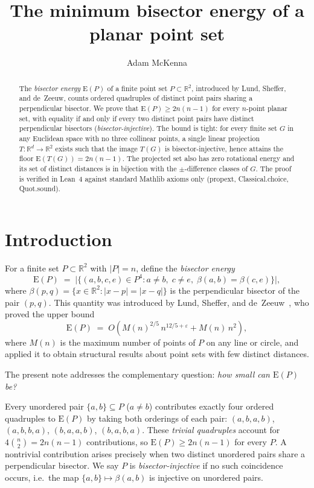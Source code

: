 \documentclass[12pt]{article}
\newcommand{\R}{\mathbb{R}}
\newcommand{\E}{\mathrm{E}}         %
\newcommand{\bis}[2]{\beta(#1,#2)}  %
\begin{document}
\title{The minimum bisector energy of a planar point set}
\author{Adam McKenna}
\date{}
\maketitle

\begin{abstract}
The \emph{bisector energy} $\E(P)$ of a finite point set $P\subset\R^2$, introduced
by Lund, Sheffer, and de~Zeeuw, counts ordered quadruples of distinct point pairs
sharing a perpendicular bisector.
We prove that $\E(P)\ge 2n(n-1)$ for every $n$-point planar set,
with equality if and only if every two distinct point pairs have distinct
perpendicular bisectors (\emph{bisector-injective}).
The bound is tight: for every finite set $G$ in any Euclidean space with no
three collinear points, a single linear projection $T\colon\R^d\to\R^2$ exists
such that the image $T(G)$ is bisector-injective, hence attains the floor
$\E(T(G))=2n(n-1)$.
The projected set also has zero rotational energy and its set of distinct
distances is in bijection with the $\pm$-difference classes of $G$.
The proof is verified in Lean~4 against standard Mathlib axioms only
(propext, Classical.choice, Quot.sound).
\end{abstract}

\section{Introduction}

For a finite set $P\subset\R^2$ with $|P|=n$, define the \emph{bisector energy}
\[
  \E(P) \;=\;
  \bigl|\{(a,b,c,e)\in P^4 : a\ne b,\; c\ne e,\;
         \bis{a}{b} = \bis{c}{e}\}\bigr|,
\]
where $\bis{p}{q} = \{x\in\R^2 : |x-p|=|x-q|\}$ is the perpendicular bisector
of the pair $(p,q)$.
This quantity was introduced by Lund, Sheffer, and de~Zeeuw~\cite{LSdZ16},
who proved the upper bound
\[
  \E(P) \;=\; O\!\left(M(n)^{2/5}\,n^{12/5+\varepsilon}+M(n)\,n^2\right),
\]
where $M(n)$ is the maximum number of points of $P$ on any line or circle,
and applied it to obtain structural results about point sets with few distinct
distances.

The present note addresses the complementary question: \emph{how small can
$\E(P)$ be?}

Every unordered pair $\{a,b\}\subseteq P$ ($a\ne b$) contributes exactly four
ordered quadruples to $\E(P)$ by taking both orderings of each pair:
$(a,b,a,b)$, $(a,b,b,a)$, $(b,a,a,b)$, $(b,a,b,a)$.
These \emph{trivial quadruples} account for $4\binom{n}{2}=2n(n-1)$ contributions,
so $\E(P)\ge 2n(n-1)$ for every $P$.
A nontrivial contribution arises precisely when two distinct unordered pairs
share a perpendicular bisector.
We say $P$ is \emph{bisector-injective} if no such coincidence occurs,
i.e.\ the map $\{a,b\}\mapsto \bis{a}{b}$ is injective on unordered pairs.
\end{document}
